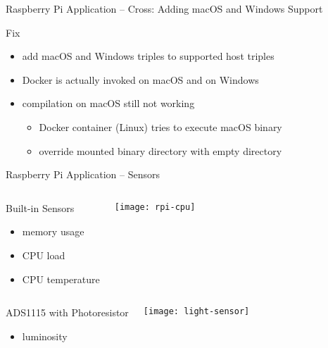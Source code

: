 \begin{frame}{Raspberry Pi Application -- Cross: Adding macOS and Windows Support}
  \begin{block}{Fix}
    \begin{itemize}
      \item add macOS and Windows triples to supported host triples
    \end{itemize}
  \end{block}

  \begin{block}{}
    \begin{itemize}
      \item Docker is actually invoked on macOS and on Windows
    \end{itemize}
  \end{block}

  \begin{block}{}
    \begin{itemize}
      \item compilation on macOS still not working
        \begin{itemize}
          \item {} Docker container (Linux) tries to execute macOS binary
          \item {} override mounted binary directory with empty directory
        \end{itemize}
    \end{itemize}
  \end{block}
\end{frame}

\begin{frame}{Raspberry Pi Application -- Sensors}
  \begin{columns}
    \begin{block}{Built-in Sensors}
      \begin{itemize}
        \item memory usage
        \item CPU load
        \item CPU temperature
      \end{itemize}
    \end{block}

    \vfill
    \centering
    \texttt{[image: rpi-cpu]}
  \end{columns}

  \begin{columns}
    \begin{block}{ADS1115 with Photoresistor}
      \begin{itemize}
          \item luminosity
      \end{itemize}
    \end{block}

    \vfill
    \centering
    \texttt{[image: light-sensor]}
  \end{columns}
\end{frame}

